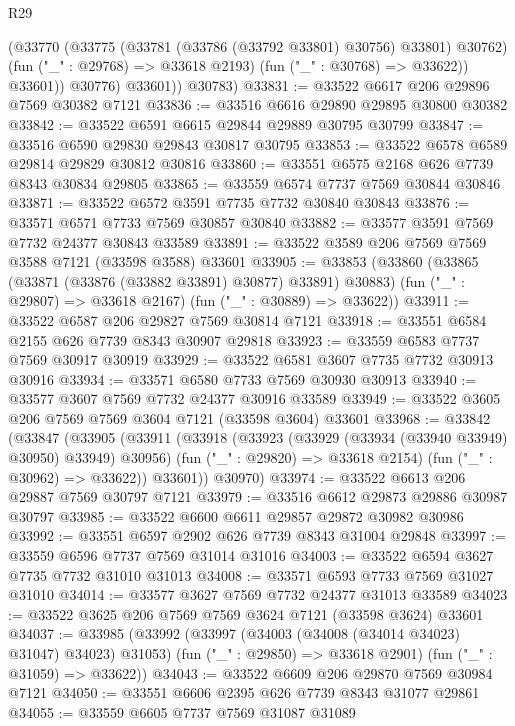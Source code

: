 \begin{lexlean}{R29}
\begin{coremodule}
                (@33770
                  (@33775 (@33781 (@33786 (@33792 @33801) @30756) @33801) @30762)
                  (fun ("_" : @29768) => @33618 @2193)
                  (fun ("_" : @30768) => @33622))
                @33601))
            @30776)
          @33601))
      @30783)
@33831 := @33522 @6617 @206 @29896 @7569 @30382 @7121
@33836 := @33516 @6616 @29890 @29895 @30800 @30382
@33842 := @33522 @6591 @6615 @29844 @29889 @30795 @30799
@33847 := @33516 @6590 @29830 @29843 @30817 @30795
@33853 := @33522 @6578 @6589 @29814 @29829 @30812 @30816
@33860 := @33551 @6575 @2168 @626 @7739 @8343 @30834 @29805
@33865 := @33559 @6574 @7737 @7569 @30844 @30846
@33871 := @33522 @6572 @3591 @7735 @7732 @30840 @30843
@33876 := @33571 @6571 @7733 @7569 @30857 @30840
@33882 := @33577 @3591 @7569 @7732 @24377 @30843 @33589
@33891 := @33522 @3589 @206 @7569 @7569 @3588 @7121 (@33598 @3588) @33601
@33905 := @33853
    (@33860
      (@33865 (@33871 (@33876 (@33882 @33891) @30877) @33891) @30883)
      (fun ("_" : @29807) => @33618 @2167)
      (fun ("_" : @30889) => @33622))
@33911 := @33522 @6587 @206 @29827 @7569 @30814 @7121
@33918 := @33551 @6584 @2155 @626 @7739 @8343 @30907 @29818
@33923 := @33559 @6583 @7737 @7569 @30917 @30919
@33929 := @33522 @6581 @3607 @7735 @7732 @30913 @30916
@33934 := @33571 @6580 @7733 @7569 @30930 @30913
@33940 := @33577 @3607 @7569 @7732 @24377 @30916 @33589
@33949 := @33522 @3605 @206 @7569 @7569 @3604 @7121 (@33598 @3604) @33601
@33968 := @33842
    (@33847
      (@33905
        (@33911
          (@33918
            (@33923 (@33929 (@33934 (@33940 @33949) @30950) @33949) @30956)
            (fun ("_" : @29820) => @33618 @2154)
            (fun ("_" : @30962) => @33622))
          @33601))
      @30970)
@33974 := @33522 @6613 @206 @29887 @7569 @30797 @7121
@33979 := @33516 @6612 @29873 @29886 @30987 @30797
@33985 := @33522 @6600 @6611 @29857 @29872 @30982 @30986
@33992 := @33551 @6597 @2902 @626 @7739 @8343 @31004 @29848
@33997 := @33559 @6596 @7737 @7569 @31014 @31016
@34003 := @33522 @6594 @3627 @7735 @7732 @31010 @31013
@34008 := @33571 @6593 @7733 @7569 @31027 @31010
@34014 := @33577 @3627 @7569 @7732 @24377 @31013 @33589
@34023 := @33522 @3625 @206 @7569 @7569 @3624 @7121 (@33598 @3624) @33601
@34037 := @33985
    (@33992
      (@33997 (@34003 (@34008 (@34014 @34023) @31047) @34023) @31053)
      (fun ("_" : @29850) => @33618 @2901)
      (fun ("_" : @31059) => @33622))
@34043 := @33522 @6609 @206 @29870 @7569 @30984 @7121
@34050 := @33551 @6606 @2395 @626 @7739 @8343 @31077 @29861
@34055 := @33559 @6605 @7737 @7569 @31087 @31089

\end{coremodule}
\end{lexlean}
